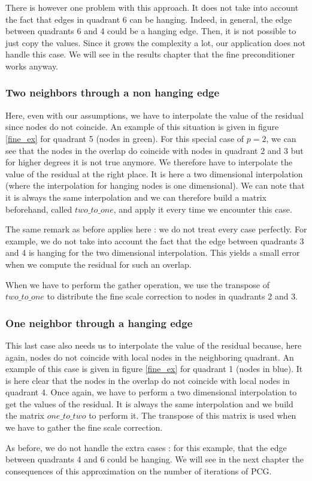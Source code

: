 There is however one problem with this approach. It does not take into account the fact that edges in quadrant 6 can be hanging. Indeed, in general, the edge between quadrants 6 and 4 could be a hanging edge. Then, it is not possible to just copy the values. Since it grows the complexity a lot, our application does not handle this case. We will see in the results chapter that the fine preconditioner works anyway. 

\subsubsection{Two neighbors through a non hanging edge}

Here, even with our assumptions, we have to interpolate the value of the residual since nodes do not coincide. An example of this situation is given in figure \ref{fine_ex} for quadrant 5 (nodes in green). For this special case of $p=2$, we can see that the nodes in the overlap do coincide with nodes in quadrant 2 and 3 but for higher degrees it is not true anymore. We therefore have to interpolate the value of the residual at the right place. It is here a two dimensional interpolation (where the interpolation for hanging nodes is one dimensional). We can note that it is always the same interpolation and we can therefore build a matrix beforehand, called $two\_to\_one$, and apply it every time we encounter this case. 

The same remark as before applies here : we do not treat every case perfectly. For example, we do not take into account the fact that the edge between quadrants 3 and 4 is hanging for the two dimensional interpolation. This yields a small error when we compute the residual for such an overlap. 

When we have to perform the gather operation, we use the transpose of $two\_to\_one$ to distribute the fine scale correction to nodes in quadrants 2 and 3. 

\subsubsection{One neighbor through a hanging edge}

This last case also needs us to interpolate the value of the residual because, here again, nodes do not coincide with local nodes in the neighboring quadrant. An example of this case is given in figure \ref{fine_ex} for quadrant 1 (nodes in blue). It is here clear that the nodes in the overlap do not coincide with local nodes in quadrant 4. Once again, we have to perform a two dimensional interpolation to get the values of the residual. It is always the same interpolation and we build the matrix $one\_to\_two$ to perform it. The transpose of this matrix is used when we have to gather the fine scale correction.

 As before, we do not handle the extra cases : for this example, that the edge between quadrants 4 and 6 could be hanging. We will see in the next chapter the consequences of this approximation on the number of iterations of PCG.

